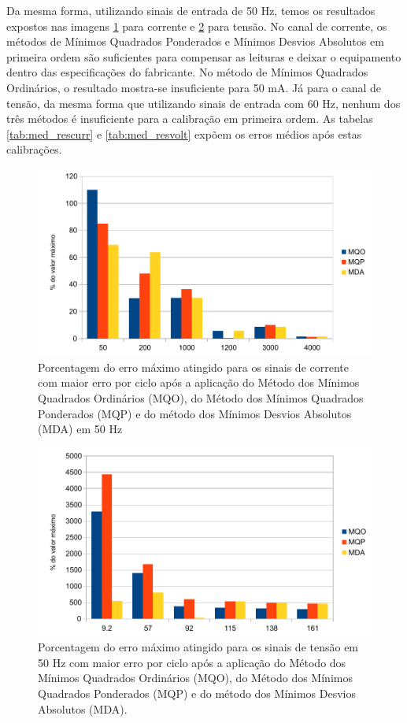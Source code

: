 Da mesma forma, utilizando sinais de entrada de 50 Hz, temos os resultados expostos nas imagens \ref{fig:res_curr50} para corrente e \ref{fig:res_volt50} para tensão. No canal de corrente, os métodos de Mínimos Quadrados Ponderados e Mínimos Desvios Absolutos em primeira ordem são suficientes para compensar as leituras e deixar o equipamento dentro das especificações do fabricante. No método de Mínimos Quadrados Ordinários, o resultado mostra-se insuficiente para 50 mA. Já para o canal de tensão, da mesma forma que utilizando sinais de entrada com 60 Hz, nenhum dos três métodos é insuficiente para a calibração em primeira ordem. As tabelas \ref{tab:med_rescurr} e \ref{tab:med_resvolt} expõem os erros médios após estas calibrações.


\begin{figure}
    \caption{Porcentagem do erro máximo atingido para os sinais de corrente com maior erro por ciclo após a aplicação do Método dos Mínimos Quadrados Ordinários (MQO), do Método dos Mínimos Quadrados Ponderados (MQP) e do método dos Mínimos Desvios Absolutos (MDA) em 50 Hz}
    \label{fig:res_curr50}
    \centering
    \includegraphics[width=0.9\linewidth]{pictures/max_err_IA_aftercalib50Hz.pdf}
\end{figure}

\begin{figure}
    \caption{Porcentagem do erro máximo atingido para os sinais de tensão em 50 Hz com maior erro por ciclo após a aplicação do Método dos Mínimos Quadrados Ordinários (MQO), do Método dos Mínimos Quadrados Ponderados (MQP) e do método dos Mínimos Desvios Absolutos (MDA).}
    \label{fig:res_volt50}
    \centering
    \includegraphics[width=0.9\linewidth]{pictures/max_err_VC_aftercalib50Hz.pdf}
\end{figure}

